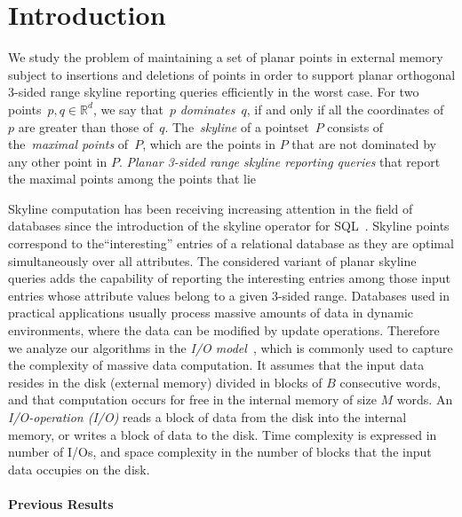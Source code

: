 \documentclass[]{article}
\begin{document}
\section{Introduction}\label{sec:intro}


We study the problem of maintaining a set of planar points in external memory
subject to insertions and deletions of points in order to support planar
orthogonal 3-sided range skyline reporting queries efficiently in the worst
case. For two points~$p,q \in \mathbb{R}^d$, we say that~$p$
\textit{dominates}~$q$, if and only if all the coordinates of~$p$ are greater
than those of~$q$. The~\textit{skyline} of a pointset~$P$ consists of
the~\textit{maximal points} of~$P$, which are the points in $P$ that are not
dominated by any other point in $P$. \textit{Planar 3-sided range skyline
reporting queries} that report the maximal points among the points that lie

Skyline computation has been receiving increasing attention in the field of
databases since the introduction of the skyline operator for SQL~\cite{BKS01}.
Skyline points correspond to the``interesting'' entries of a relational database
as they are optimal simultaneously over all attributes. The considered variant
of planar skyline queries adds the capability of reporting the interesting
entries among those input entries whose attribute values belong to a given
3-sided range.  Databases used in practical applications usually process massive
amounts of data in dynamic environments, where the data can be modified by
update operations.  Therefore we analyze our algorithms in the \textit{I/O
model}~\cite{AV88}, which is commonly used to capture the complexity of massive
data computation.  It assumes that the input data resides in the disk (external
memory) divided in blocks of $B$ consecutive words, and that computation occurs
for free in the internal memory of size $M$ words.  An \textit{I/O-operation
(I/O)} reads a block of data from the disk into the internal memory, or writes a
block of data to the disk. Time complexity is expressed in number of I/Os, and
space complexity in the number of blocks that the input data occupies on the
disk.

\paragraph{Previous Results}
\end{document}
